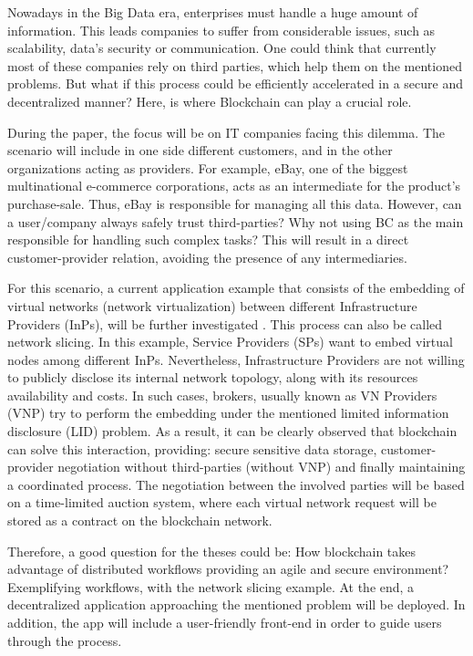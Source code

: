 Nowadays in the Big Data era, enterprises must handle a huge amount of information. This leads companies to suffer from considerable issues, such as scalability, data's security or communication. One could think that currently most of these companies rely on third parties, which help them on the mentioned problems. But what if this process could be efficiently accelerated in a secure and decentralized manner? Here, is where Blockchain can play a crucial role.

During the paper, the focus will be on IT companies facing this dilemma. The scenario will include in one side different customers, and in the other organizations acting as providers. For example, eBay, one of the biggest multinational e-commerce corporations, acts as an intermediate for the product's purchase-sale. Thus, eBay is responsible for managing all this data. However, can a user/company always safely trust third-parties? Why not using BC as the main responsible for handling such complex tasks? This will result in a direct customer-provider relation, avoiding the presence of any intermediaries.

For this scenario, a current application example that consists of the embedding of virtual networks (network virtualization) between different Infrastructure Providers (InPs), will be further investigated \cite{dietrich2015multi}. This process can also be called network slicing. In this example, Service Providers (SPs) want to embed virtual nodes among different InPs. Nevertheless, Infrastructure Providers are not willing to publicly disclose its internal network topology, along with its resources availability and costs. In such cases, brokers, usually known as VN Providers (VNP) try to perform the embedding under the mentioned limited information disclosure (LID) problem. As a result, it can be clearly observed that blockchain can solve this interaction, providing: secure sensitive data storage, customer-provider negotiation without third-parties (without VNP) and finally maintaining a coordinated process. The negotiation between the involved parties will be based on a time-limited auction system, where each virtual network request will be stored as a contract on the blockchain network.

Therefore, a good question for the theses could be: How blockchain takes advantage of distributed workflows providing an agile and secure environment? Exemplifying workflows, with the network slicing example. At the end, a decentralized application approaching the mentioned problem will be deployed. In addition, the app will include a user-friendly front-end in order to guide users through the process. 



